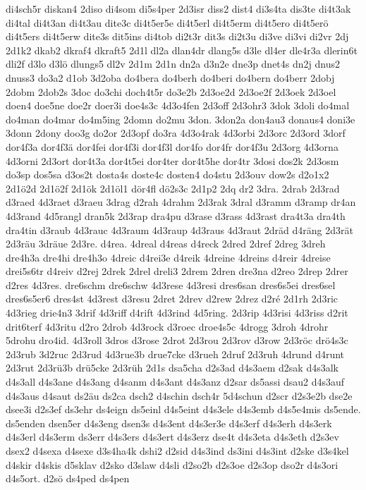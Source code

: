 {di4sch5r
diskan4
2diso
di4som
di5s4per
2d3isr
diss2
dist4
di3s4ta
dis3te
di4t3ak
di4tal
di4t3an
di4t3au
dite3c
di4t5er5e
di4t5erl
di4t5erm
di4t5ero
di4t5erö
di4t5ers
di4t5erw
dite3s
dit5ins
di4tob
di2t3r
dit3s
di2t3u
di3ve
di3vi
di2vr
2dj
2d1k2
dkab2
dkraf4
dkraft5
2d1l
dl2a
dlan4dr
dlang5s
d3le
dl4er
dle4r3a
dlerin6t
dli2f
d3lo
d3lö
dlungs5
dl2v
2d1m
2d1n
dn2a
d3n2e
dne3p
dnet4s
dn2j
dnus2
dnuss3
do3a2
d1ob
3d2oba
do4bera
do4berh
do4beri
do4bern
do4berr
2dobj
2dobm
2dob2s
3doc
do3chi
doch4t5r
do3e2b
2d3oe2d
2d3oe2f
2d3oek
2d3oel
doen4
doe5ne
doe2r
doer3i
doe4s3c
4d3o4fen
2d3off
2d3ohr3
3dok
3doli
do4mal
do4man
do4mar
do4m5ing
2domn
do2mu
3don.
3don2a
don4au3
donaus4
doni3e
3donn
2dony
doo3g
do2or
2d3opf
do3ra
4d3o4rak
4d3orbi
2d3orc
2d3ord
3dorf
dor4f3a
dor4f3ä
dor4fei
dor4f3i
dor4f3l
dor4fo
dor4fr
dor4f3u
2d3org
4d3orna
4d3orni
2d3ort
dor4t3a
dor4t5ei
dor4ter
dor4t5he
dor4tr
3dosi
dos2k
2d3osm
do3sp
dos5sa
d3os2t
dosta4s
doste4c
dosten4
do4stu
2d3ouv
dow2s
d2o1x2
2d1ö2d
2d1ö2f
2d1ök
2d1öl1
dör4fl
dö2s3c
2d1p2
2dq
dr2
3dra.
2drab
2d3rad
d3raed
4d3raet
d3raeu
3drag
d2rah
4drahm
2d3rak
3dral
d3ramm
d3ramp
dr4an
4d3rand
4d5rangl
dran5k
2d3rap
dra4pu
d3rase
d3rass
4d3rast
dra4t3a
dra4th
dra4tin
d3raub
4d3rauc
4d3raum
4d3raup
4d3raus
4d3raut
2dräd
d4räng
2d3rät
2d3räu
3dräue
2d3re.
d4rea.
4dreal
d4reas
d4reck
2dred
2dref
2dreg
3dreh
dre4h3a
dre4hi
dre4h3o
4dreic
d4rei3e
d4reik
4dreine
4dreins
d4reir
4dreise
drei5s6tr
d4reiv
d2rej
2drek
2drel
dreli3
2drem
2dren
dre3na
d2reo
2drep
2drer
d2res
4d3res.
dre6schm
dre6schw
4d3rese
4d3resi
dres6san
dres6s5ei
dres6sel
dres6s5er6
dres4st
4d3rest
d3resu
2dret
2drev
d2rew
2drez
d2ré
2d1rh
2d3ric
4d3rieg
drie4n3
3drif
4d3riff
d4rift
4d3rind
4d5ring.
2d3rip
4d3risi
4d3riss
d2rit
drit6terf
4d3ritu
d2ro
2drob
4d3rock
d3roec
droe4s5c
4drogg
3droh
4drohr
5drohu
dro4id.
4d3roll
3dros
d3rose
2drot
2d3rou
2d3rov
d3row
2d3röc
drö4s3c
2d3rub
3d2ruc
2d3rud
4d3rue3b
drue7cke
d3rueh
2druf
2d3ruh
4drund
d4runt
2d3rut
2d3rü3b
drü5cke
2d3rüh
2d1s
dsa5cha
d2s3ad
d4s3aem
d2sak
d4s3alk
d4s3all
d4s3ane
d4s3ang
d4sanm
d4s3ant
d4s3anz
d2sar
ds5assi
dsau2
d4s3auf
d4s3aus
d4saut
ds2äu
ds2ca
dsch2
d4schin
dsch4r
5d4schun
d2scr
d2s3e2b
dse2e
dsee3i
d2s3ef
ds3ehr
ds4eign
ds5einl
d4s5eint
d4s3ele
d4s3emb
d4s5e4mis
ds5ende.
ds5enden
dsen5er
d4s3eng
dsen3s
d4s3ent
d4s3er3e
d4s3erf
d4s3erh
d4s3erk
d4s3erl
d4s3erm
ds3err
d4s3ers
d4s3ert
d4s3erz
dse4t
d4s3eta
d4s3eth
d2s3ev
dsex2
d4sexa
d4sexe
d3s4ha4k
dshi2
d2sid
d4s3ind
ds3ini
d4s3int
d2ske
d3s4kel
d4skir
d4skis
d5sklav
d2sko
d3slaw
d4sli
d2so2b
d2s3oe
d2s3op
dso2r
d4s3ori
d4s5ort.
d2sö
ds4ped
ds4pen
}
